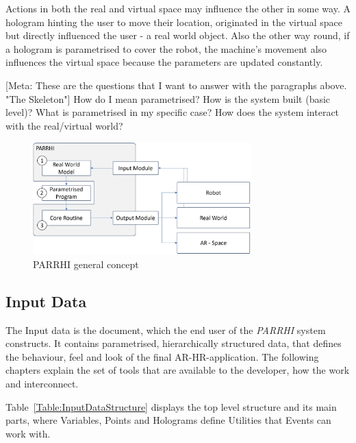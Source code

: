 Actions in both the real and virtual space may influence the other in some way. A hologram hinting the user to move their location, originated in the virtual space but directly influenced the user - a real world object. Also the other way round, if a hologram is parametrised to cover the robot, the machine's movement also influences the virtual space because the parameters are updated constantly.

[Meta: These are the questions that I want to answer with the paragraphs above. "The Skeleton"]
How do I mean parametrised?
How is the system built (basic level)?
What is parametrised in my specific case?
How does the system interact with the real/virtual world?

\begin{figure}[h]
	\centering
	\includegraphics[width=0.75\textwidth]{Figures/PARRHIConcept03.jpg}
	\caption{PARRHI general concept}
	\label{Fig:PARRHIConcept}
\end{figure}


\clearpage
\subsection{Input Data}

The Input data is the document, which the end user of the \textit{PARRHI} system constructs. It contains parametrised, hierarchically structured data, that defines the behaviour, feel and look of the final AR-HR-application. The following chapters explain the set of tools that are available to the developer, how the work and interconnect.

Table~\ref{Table:InputDataStructure} displays the top level structure and its main parts, where Variables, Points and Holograms define Utilities that Events can work with. 

